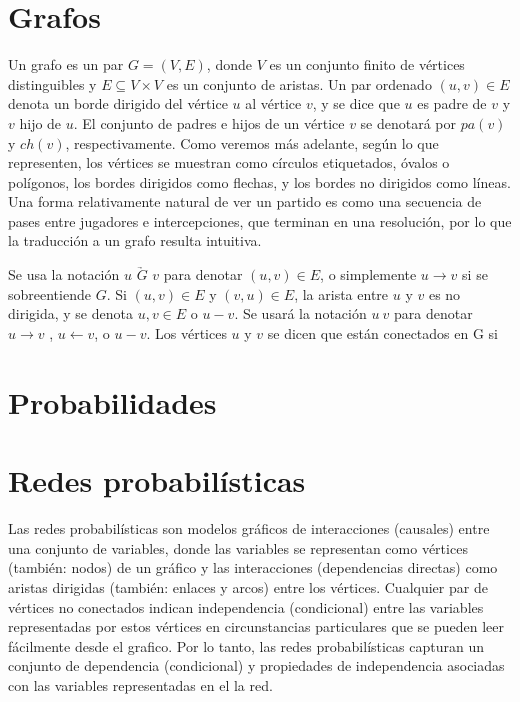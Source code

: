 \section{Grafos}
Un grafo es un par $G = (V, E)$, donde $V$ es un conjunto finito de vértices distinguibles y 
$E \subseteq V \times V$ es un conjunto de aristas. Un par ordenado $(u, v) \in E$ denota un borde dirigido
del vértice $u$ al vértice $v$, y se dice que $u$ es padre de $v$ y $v$ hijo de $u$.
El conjunto de padres e hijos de un vértice $v$ se denotará por $pa(v)$ y $ch(v)$, respectivamente.
Como veremos más adelante, según lo que representen, los vértices se muestran como círculos 
etiquetados, óvalos o polígonos, los bordes dirigidos como flechas, y los 
bordes no dirigidos como líneas. Una forma relativamente natural de ver un partido es como una secuencia de 
pases entre jugadores e intercepciones, que terminan en una resolución, por lo que la traducción a un grafo resulta 
intuitiva.

Se usa la notación $u$ $\underrightarrow{G}$ $v$ para denotar $(u,v) \in E$, o simplemente 
$u \rightarrow v$ si se sobreentiende $G$. Si $(u,v) \in E$ y $(v,u) \in E$, la arista 
entre $u$ y $v$ es no dirigida, y se denota ${u,v} \in E$ o $u - v$. Se usará la notación 
$u ~ v$ para denotar $u \rightarrow v$ , $u \leftarrow v$, o $u - v$. Los vértices $u$ y $v$ 
se dicen que están conectados en G si

\section{Probabilidades} 
\section{Redes probabilísticas}
Las redes probabilísticas son modelos gráficos de interacciones (causales) entre una
conjunto de variables, donde las variables se representan como vértices (también: nodos)
de un gráfico y las interacciones (dependencias directas) como aristas dirigidas (también:
enlaces y arcos) entre los vértices. Cualquier par de vértices no conectados indican 
independencia (condicional) entre las variables representadas
por estos vértices en circunstancias particulares que se pueden leer fácilmente desde el
grafico. Por lo tanto, las redes probabilísticas capturan un conjunto de dependencia (condicional)
y propiedades de independencia asociadas con las variables representadas en el
la red.

